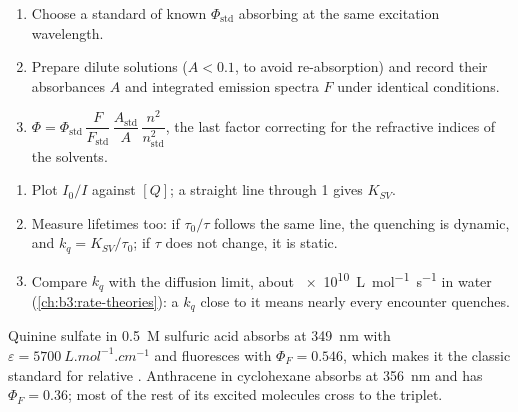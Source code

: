 \begin{method}\label{met:b3:electronic-spectroscopy:relative-yield}
\begin{enumerate}
  \item Choose a standard of known $\Phi_{\mathrm{std}}$ absorbing at the same
        excitation wavelength.
  \item Prepare dilute solutions ($A < 0.1$, to avoid re-absorption) and record
        their absorbances $A$ and integrated emission spectra $F$ under identical
        conditions.
  \item $\Phi = \Phi_{\mathrm{std}}\,\dfrac{F}{F_{\mathrm{std}}}\,\dfrac{A_{\mathrm{std}}}{A}\,
        \dfrac{n^2}{n_{\mathrm{std}}^2}$, the last factor correcting for the refractive
        indices of the solvents.
\end{enumerate}
\end{method}

\begin{method}\label{met:b3:electronic-spectroscopy:stern-volmer}
\begin{enumerate}
  \item Plot $I_0/I$ against $[Q]$; a straight line through 1 gives $K_{SV}$.
  \item Measure lifetimes too: if $\tau_0/\tau$ follows the same line, the quenching
        is dynamic, and $k_q = K_{SV}/\tau_0$; if $\tau$ does not change, it is static.
  \item Compare $k_q$ with the diffusion limit, about \qty{e10}{L.mol^{-1}.s^{-1}} in
        water (\cref{ch:b3:rate-theories}): a $k_q$ close to it means nearly every
        encounter quenches.
\end{enumerate}
\end{method}

\begin{example}\label{ex:b3:electronic-spectroscopy:quinine}
Quinine sulfate in \qty{0.5}{M} sulfuric acid absorbs at \qty{349}{nm} with $\varepsilon =
\qty{5700}{L.mol^{-1}.cm^{-1}}$ and fluoresces with $\Phi_F = 0.546$, which makes it the
classic standard for relative . Anthracene in cyclohexane
absorbs at \qty{356}{nm} and has $\Phi_F = 0.36$; most of the rest of its excited
molecules cross to the triplet.
\end{example}

